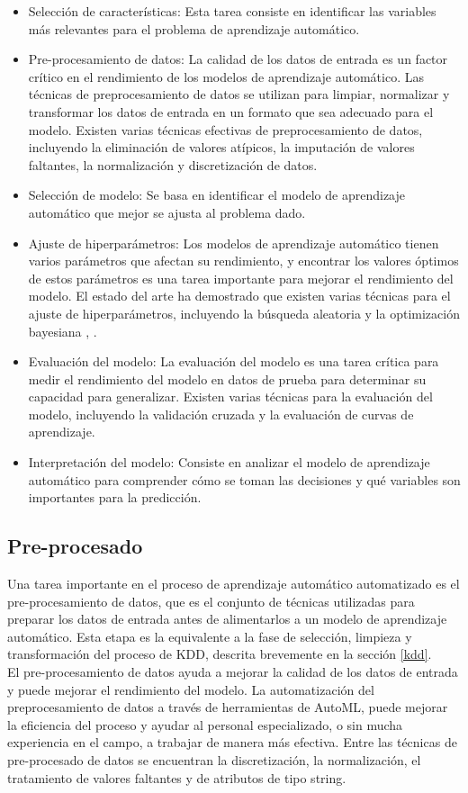 \begin{itemize}
	\item Selección de características: Esta tarea consiste en identificar las variables más relevantes para el problema de aprendizaje automático. 
	\item Pre-procesamiento de datos: La calidad de los datos de entrada es un factor crítico en el rendimiento de los modelos de aprendizaje automático. Las técnicas de preprocesamiento de datos se utilizan para limpiar, normalizar y transformar los datos de entrada en un formato que sea adecuado para el modelo. Existen varias técnicas efectivas de preprocesamiento de datos, incluyendo la eliminación de valores atípicos, la imputación de valores faltantes, la normalización y discretización de datos.
	\item Selección de modelo: Se basa en identificar el modelo de aprendizaje automático que mejor se ajusta al problema dado.
	\item Ajuste de hiperparámetros: Los modelos de aprendizaje automático tienen varios parámetros que afectan su rendimiento, y encontrar los valores óptimos de estos parámetros es una tarea importante para mejorar el rendimiento del modelo. El estado del arte ha demostrado que existen varias técnicas para el ajuste de hiperparámetros, incluyendo la búsqueda aleatoria \citep{zoller2021benchmark} y la optimización bayesiana \citep{he2021automl}, \citep{hutter2019automated}.
	\item Evaluación del modelo: La evaluación del modelo es una tarea crítica para medir el rendimiento del modelo en datos de prueba para determinar su capacidad para generalizar. Existen varias técnicas para la evaluación del modelo, incluyendo la validación cruzada y la evaluación de curvas de aprendizaje.
	\item Interpretación del modelo: Consiste en analizar el modelo de aprendizaje automático para comprender cómo se toman las decisiones y qué variables son importantes para la predicción.
\end{itemize}

\subsection{Pre-procesado}
Una tarea importante en el proceso de aprendizaje automático automatizado es el pre-procesamiento de datos, que es el conjunto de técnicas utilizadas para preparar los datos de entrada antes de alimentarlos a un modelo de aprendizaje automático. Esta etapa es la equivalente a la fase de selección, limpieza y transformación del proceso de KDD, descrita brevemente en la sección \ref{kdd}. \\
El pre-procesamiento de datos ayuda a mejorar la calidad de los datos de entrada y puede mejorar el rendimiento del modelo. La automatización del preprocesamiento de datos a través de herramientas de AutoML, puede mejorar la eficiencia del proceso y ayudar al personal especializado, o sin mucha experiencia en el campo, a trabajar de manera más efectiva. Entre las técnicas de pre-procesado de datos se encuentran la discretización, la normalización, el tratamiento de valores faltantes y de atributos de tipo string.


